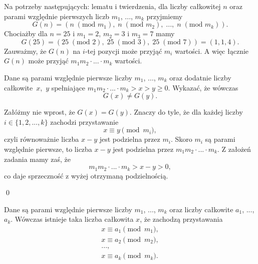 


\noindent
Na potrzeby następujących: lematu i twierdzenia, dla liczby całkowitej $n$ oraz parami względnie pierwszych liczb $m_1$, ..., $m_k$ przyjmiemy
\[
	G(n) = (n \;(\text{mod } m_1),\; n \;(\text{mod } m_2),\; ...,\; n \;(\text{mod } m_k)).
\]
Chociażby dla $n = 25$ i $m_1 = 2$, $m_2 = 3$ i $m_3 = 7$ mamy
\[
	G(25) = (25 \;(\text{mod } 2),\; 25 \;(\text{mod } 3),\; 25 \;(\text{mod } 7)) = (1, 1, 4).
\]
Zauważmy, że $G(n)$ na $i$-tej pozycji może przyjąć $m_i$ wartości. A więc łącznie $G(n)$ może przyjąć $m_1m_2\cdot...\cdot m_k$ wartości.

\vspace{10px}


\noindent
Dane są parami względnie pierwsze liczby $m_1$, ..., $m_k$ oraz dodatnie liczby całkowite~$x$,~$y$ spełniające $m_1m_2\cdot ... \cdot m_k > x > y \geqslant 0$. Wykazać, że wówczas
\[
	G(x) \neq G(y).
\]


\noindent
Załóżmy nie wprost, że $G(x) = G(y)$. Znaczy do tyle, że dla każdej liczby $i \in \{1, 2, ..., k\}$ zachodzi przystawanie
\[
	x \equiv y \pmod{m_i},
\]
czyli równoważnie liczba $x - y$ jest podzielna przez $m_i$. Skoro $m_i$ są parami względnie pierwsze, to liczba $x - y$ jest podzielna przez $m_1m_2 \cdot ... \cdot m_k$. Z założeń zadania mamy zaś, że
\[
	m_1m_2 \cdot ... \cdot m_k > x - y > 0,
\]
co daje sprzeczność z wyżej otrzymaną podzielnością.

\qed

\vspace{10px}


\noindent
Dane są parami względnie pierwsze liczby $m_1$, ..., $m_k$ oraz  liczby całkowite $a_1$, ..., $a_k$. Wówczas istnieje taka liczba całkowita $x$, że zachodzą przystawania
\begin{gather*}
	x \equiv a_1 \pmod{m_1}, \\
	x \equiv a_2 \pmod{m_2}, \\
	..., \\
	x \equiv a_k \pmod{m_k}.
\end{gather*}

